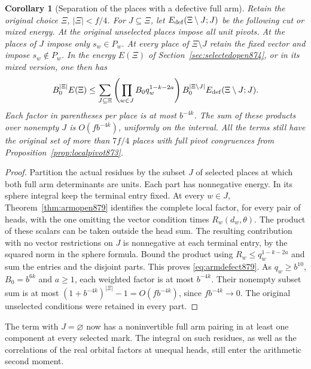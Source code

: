 \documentclass[a4paper,11pt]{article}
\newtheorem{corollary}[proposition]{Corollary}
\theoremstyle{definition}
\theoremstyle{remark}
\numberwithin{equation}{section}
\begin{document}
\begin{corollary}[Separation of the places with a defective full arm]
\leavevmode\label{cor:armdefect879}
Retain the original choice \(\Xi\), \(|\Xi|<f/4\). For
\(J\subseteq\Xi\), let \(E_{\rm def}(\Xi\setminus J;J)\) be the
following cut or mixed energy. At the original unselected places
impose all unit pivots. At the places of \(J\) impose only
\(s_w\in P_w\). At every place of \(\Xi\setminus J\) retain the
fixed vector and impose \(s_w\notin P_w\). In the energy \(E(\Xi)\)
of Section~\ref{sec:selectedopen874}, or in its mixed version, one
then has
\begin{align}
 B_0^{|\Xi|}E(\Xi)
 \le \sum_{J\subseteq\Xi}
     \left(\prod_{w\in J} B_0q_w^{1-k-2a}\right)
       B_0^{|\Xi\setminus J|}
       E_{\rm def}(\Xi\setminus J;J).
 \label{eq:armdefect879}
\end{align}
Each factor in parentheses per place is at most \(b^{-4k}\).
The sum of these products over nonempty \(J\) is
\(O(f b^{-4k})\), uniformly on the interval. All the terms still
have the original set of more than \(7f/4\) places with full
pivot congruences from Proposition~\ref{prop:localpivot873}.
\end{corollary}
\begin{proof}
Partition the actual residues by the subset \(J\) of selected
places at which both full arm determinants are units. Each part
has nonnegative energy. In its sphere integral keep the terminal
entry fixed. At every \(w\in J\), Theorem~\ref{thm:armopen879}
identifies the complete local factor, for every pair of heads,
with the one omitting the vector condition times \(R_w(d_w,\theta)\).
The product of these scalars can be taken outside the head sum.
The resulting contribution with no vector restrictions on \(J\)
is nonnegative at each terminal entry, by the squared norm in
the sphere formula. Bound the product using
\(R_w\le q_w^{1-k-2a}\) and sum the entries and the disjoint
parts. This proves \eqref{eq:armdefect879}. As \(q_w\ge b^{10}\),
\(B_0=b^{6k}\) and \(a\ge1\), each weighted factor is at most
\(b^{-4k}\). Their nonempty subset sum is at most
\((1+b^{-4k})^{|\Xi|}-1=O(f b^{-4k})\), since \(f b^{-4k}\to0\).
The original unselected conditions were retained in every part.
\end{proof}

The term with \(J=\varnothing\) now has a noninvertible full arm
pairing in at least one component at every selected mark. The
integral on such residues, as well as the correlations of the
real orbital factors at unequal heads, still enter the arithmetic
second moment.
\clearpage
\end{document}
